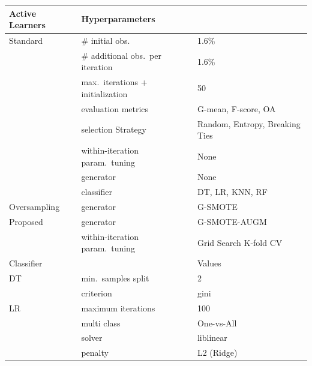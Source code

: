 \documentclass[parskip=full]{scrartcl}
\begin{document}
\begin{table}[H]
	\centering
	\begin{tabular}{lll}
		\toprule
		Active Learners & Hyperparameters                  &                                \\
		\midrule
		Standard        & \# initial obs.\                  & 1.6\%                          \\
                        & \# additional obs.\ per iteration & 1.6\%                          \\
                        & max.\ iterations + initialization & 50                             \\
                        & evaluation metrics                & G-mean, F-score, OA            \\
                        & selection Strategy                & Random, Entropy, Breaking Ties \\
                        & within-iteration param.\ tuning   & None                           \\
                        & generator                         & None                           \\
                        & classifier                        & DT, LR, KNN, RF                \\
        Oversampling    & generator                         & G-SMOTE                        \\
        Proposed        & generator                         & G-SMOTE-AUGM                   \\
                        & within-iteration param.\ tuning   & Grid Search K-fold CV          \\
		\toprule
		Classifier      &                                  & Values                         \\
		\midrule
        DT              & min.\ samples split              & 2                              \\
                        & criterion                        & gini                           \\
		LR              & maximum iterations               & 100                            \\
                        & multi class                      & One-vs-All                     \\
		                & solver                           & liblinear                      \\
                        & penalty                          & L2 (Ridge)                     \\

\end{tabular}
\end{table}
\end{document}
